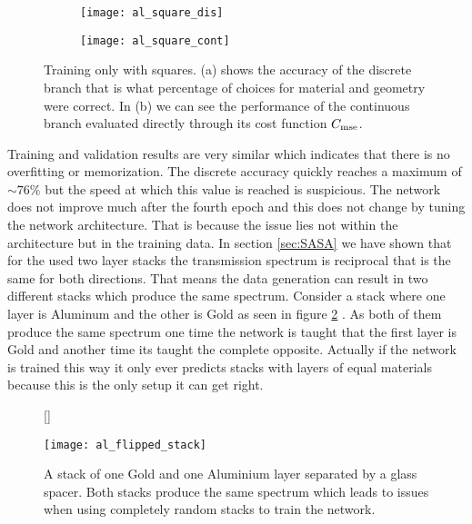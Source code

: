 \begin{figure}[H]
\centering
\captionsetup[subfigure]{position=b}
\begin{subfigure}{.5\textwidth}
    \centering
    \texttt{[image: al\_square\_dis]}
    \caption{}
\end{subfigure}%
\begin{subfigure}{.5\textwidth}
    \centering
    \texttt{[image: al\_square\_cont]}
    \caption{}
\end{subfigure}

\caption{Training only with squares. (a) shows the accuracy of the discrete branch that is what percentage of choices for material and geometry were correct. In (b) we can see the performance of the continuous branch evaluated directly through its cost function $C_{\mathrm{mse}}$.}
\label{fig:al:square_results}
\end{figure}


Training and validation results are very similar which indicates that there is no overfitting or memorization. The discrete accuracy quickly reaches a maximum of $\sim 76\%$ but the speed at which this value is reached is suspicious. The network does not improve much after the fourth epoch and this does not change by tuning the network architecture. That is because the issue lies not within the architecture but in the training data. In section \ref{sec:SASA} we have shown that for the used two layer stacks the transmission spectrum is reciprocal that is the same for both directions. That means the data generation can result in two different stacks which produce the same spectrum. Consider a stack where one layer is Aluminum and the other is Gold as seen in figure \ref{fig:al:same_spec} . As both of them produce the same spectrum one time the network is taught that the first layer is Gold and another time its taught the complete opposite. Actually if the network is trained this way it only ever predicts stacks with layers of equal materials because this is the only setup it can get right.


\begin{figure}[H]
    [\FBwidth]
    {\caption{A stack of one Gold and one Aluminium layer separated by a glass spacer. Both stacks produce the same spectrum which leads to issues when using completely random stacks to train the network.}
    \label{fig:al:same_spec}}
    {\texttt{[image: al\_flipped\_stack]}}
\end{figure}



